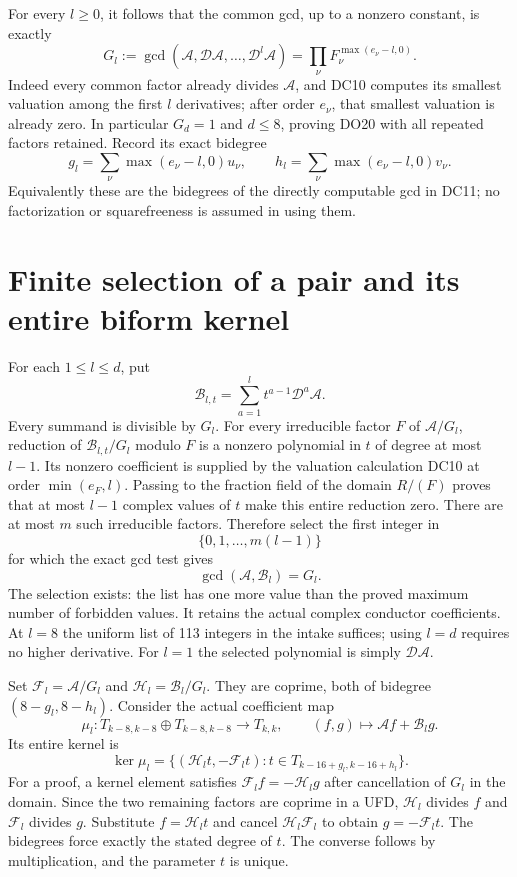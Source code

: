\documentclass[11pt]{article}
\begin{document}
For every $l\ge0$, it follows that the common gcd, up to a nonzero
constant, is exactly
\[
 G_l:=\gcd(\mathcal A,\mathcal D\mathcal A,\ldots,
                       \mathcal D^l\mathcal A)
       =\prod_\nu F_\nu^{\max(e_\nu-l,0)}.                       \tag{DC11}
\]
Indeed every common factor already divides $\mathcal A$, and DC10
computes its smallest valuation among the first $l$ derivatives;
after order $e_\nu$, that smallest valuation is already zero.
In particular $G_d=1$ and $d\le8$, proving DO20 with all repeated
factors retained.  Record its exact bidegree
\[
 g_l=\sum_\nu\max(e_\nu-l,0)u_\nu,\qquad
 h_l=\sum_\nu\max(e_\nu-l,0)v_\nu.                              \tag{DC12}
\]
Equivalently these are the bidegrees of the directly computable gcd
in DC11; no factorization or squarefreeness is assumed in using them.

\section{Finite selection of a pair and its entire biform kernel}
For each $1\le l\le d$, put
\[
 \mathcal B_{l,t}=\sum_{a=1}^{l}t^{a-1}\mathcal D^a\mathcal A.
                                                                    \tag{DC13}
\]
Every summand is divisible by $G_l$.  For every irreducible factor
$F$ of $\mathcal A/G_l$, reduction of
$\mathcal B_{l,t}/G_l$ modulo $F$ is a nonzero polynomial in $t$ of
degree at most $l-1$.  Its nonzero coefficient is supplied by the
valuation calculation DC10 at order $\min(e_F,l)$.
Passing to the fraction field of the domain $R/(F)$ proves that
at most $l-1$ complex values of $t$ make this entire reduction zero.
There are at most $m$ such irreducible factors.  Therefore select the
first integer in
\[
 \{0,1,\ldots,m(l-1)\}
\]
for which the exact gcd test gives
\[
 \gcd(\mathcal A,\mathcal B_l)=G_l.                              \tag{DC14}
\]
The selection exists: the list has one more value than the proved
maximum number of forbidden values.  It retains the actual complex
conductor coefficients.  At $l=8$ the uniform list of 113 integers
in the intake suffices; using $l=d$ requires no higher derivative.
For $l=1$ the selected polynomial is simply $\mathcal D\mathcal A$.

Set $\mathcal F_l=\mathcal A/G_l$ and
$\mathcal H_l=\mathcal B_l/G_l$.  They are coprime, both of
bidegree $(8-g_l,8-h_l)$.  Consider the actual coefficient map
\[
 \mu_l:T_{k-8,k-8}\oplus T_{k-8,k-8}\longrightarrow T_{k,k},
 \qquad (f,g)\longmapsto\mathcal Af+\mathcal B_lg.                \tag{DC15}
\]
Its entire kernel is
\[
 \ker\mu_l=
 \{(\mathcal H_l t,-\mathcal F_l t):
                 t\in T_{k-16+g_l,k-16+h_l}\}.                  \tag{DC16}
\]
For a proof, a kernel element satisfies
$\mathcal F_l f=-\mathcal H_l g$ after cancellation of $G_l$ in
the domain.  Since the two remaining factors are coprime in a UFD,
$\mathcal H_l$ divides $f$ and $\mathcal F_l$ divides $g$.  Substitute
$f=\mathcal H_l t$ and cancel $\mathcal H_l\mathcal F_l$ to obtain
$g=-\mathcal F_l t$.  The bidegrees force exactly the stated degree
of $t$.  The converse follows by multiplication, and the parameter
$t$ is unique.
\end{document}
